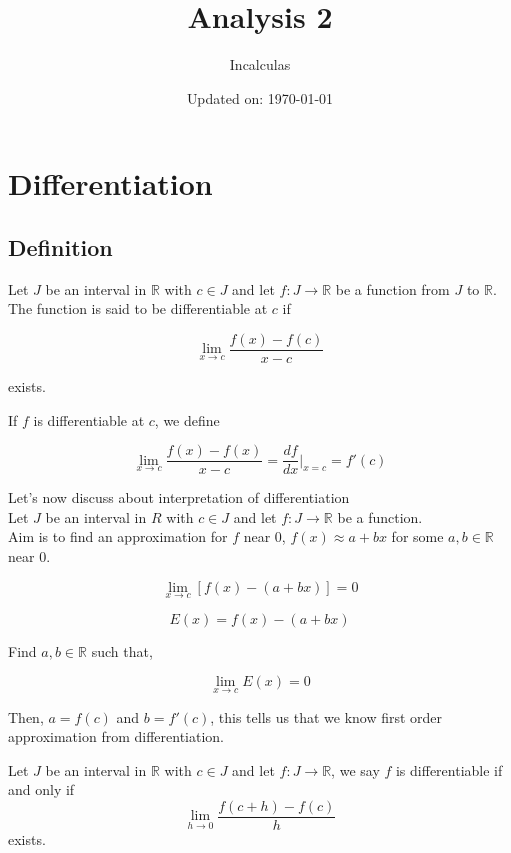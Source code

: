 \documentclass[11pt,a4paper]{colorart}
\title{\huge Analysis 2}
\author{Incalculas}
\date{Updated on: \today}
\def\l{\left}
\def\r{\right}
\def\R{\mathbb{R}}
\def\ra{\rightarrow}
\begin{document}
\maketitle
\tableofcontents
\newpage

\section{Differentiation}

\subsection{Definition}

\begin{definition}[Differentiation]
	Let $J$ be an interval in $\R$ with $c\in J$ and let $f:J\ra \R$ be a function from $J$ to $\R$.
	The function is said to be differentiable at $c$ if 
	
	\[ \lim_{ x \to c } \frac{ f(x) - f(c) }{ x - c } \]
	
	exists.

\end{definition}

\begin{notation}[Differentiation]
	If $f$ is differentiable at $c$, we define 
	
	\[ \lim_{ x \to c } \frac{ f(x) - f(x) }{ x - c } 
	   = \frac{ df }{ dx } \biggr|_{ x=c } = f'(c) \]
\end{notation}

Let's now discuss about interpretation of differentiation\\

Let $J$ be an interval in $R$ with $c\in J$ and let $f:J\ra \R$ be a function.\\

Aim is to find an approximation for $f$ near 0, $f(x) \approx a + bx$ for some $a,b \in \R$ near 0.

\[ \lim_{x \to c} \l[ f(x) - (a+bx) \r] = 0 \]

\[ E(x) = f(x) - (a+bx) \]

Find $a,b \in \R$ such that,

\[ \lim_{x \to c} E(x) = 0 \]

Then, $a=f(c)$ and $b=f'(c)$, this tells us  that we know first order approximation from differentiation. 

\begin{definition}
	Let $J$ be an interval in $\R$ with $c \in J$ and let $f:J \ra \R$, we say $f$ is differentiable if and only if 
	\[ \lim_{h \to 0} \frac{ f(c+h) - f(c) }{ h } \]
	exists.
\end{definition}
\end{document}
